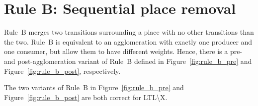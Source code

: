\section*{Rule B: Sequential place removal}\label{sec:rule_b}
Rule~B merges two transitions surrounding a place with no other transitions than the two.
Rule~B is equivalent to an agglomeration with exactly one producer and one consumer, but allow them to have different weights.
Hence, there is a pre- and post-agglomeration variant of Rule~B defined in Figure~\ref{fig:rule_b_pre} and Figure~\ref{fig:rule_b_post}, respectively.

\begin{theorem}\label{theorem:rule_b}
    The two variants of Rule~B in Figure~\ref{fig:rule_b_pre} and Figure~\ref{fig:rule_b_post} are both correct for LTL\textbackslash X.
\end{theorem}

